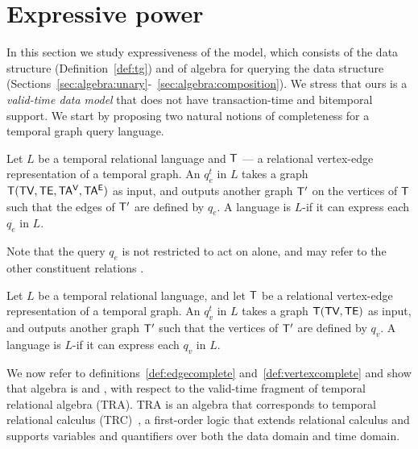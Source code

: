 \section{Expressive power}
\label{sec:formal}

In this section we study expressiveness of the \tg model, which
consists of the \tg data structure (Definition~\ref{def:tg}) and of
\tg algebra for querying the data structure
(Sections~\ref{sec:algebra:unary}-~\ref{sec:algebra:composition}).  We
stress that ours is a {\em valid-time data model} that does not have
transaction-time and bitemporal support.  We start by proposing two
natural notions of completeness for a temporal graph query language.

\begin{definition}
  Let $L$ be a temporal relational language and $\mathsf{T}$ --- a
  relational vertex-edge representation of a temporal graph.  An
  \edgeq $q^t_e$ in $L$ takes a graph $\mathsf{T} (\textsf{TV}, \textsf{TE}, \mathsf{TA^{V}}, \mathsf{TA^{E}})$ as
  input, and outputs another graph $\mathsf{T}'$ on the vertices of $\mathsf{T}$
  such that the edges of $\mathsf{T}'$ are defined by $q_e$.  A language is
  $L$-\edgec if it can express each $q_e$ in $L$.
  \label{def:edgecomplete}
\end{definition}

Note that the query $q_e$ is not restricted to act on \te alone, and
may refer to the other constituent relations \tve.


\begin{definition}
  Let $L$ be a temporal relational language, and let $\mathsf{T}$ be a
  relational vertex-edge representation of a temporal graph.  An
  \vertexq $q^t_v$ in $L$ takes a graph $\mathsf{T} (\textsf{TV}, \textsf{TE})$ as input,
  and outputs another graph $\mathsf{T}'$ such that the vertices of $\mathsf{T}'$
  are defined by $q_v$. A language is $L$-\vertexc if it can express
  each $q_v$ in $L$.
\label{def:vertexcomplete}
\end{definition}

We now refer to definitions~\ref{def:edgecomplete}
and~\ref{def:vertexcomplete} and show that \ql algebra is \edgec and
\vertexc, with respect to the valid-time fragment of temporal
relational algebra (TRA).  TRA is an algebra that corresponds to
temporal relational calculus
(TRC)~\cite{DBLP:reference/db/ChomickiT09b}, a first-order logic that
extends relational calculus and supports variables and quantifiers
over both the data domain and time domain.

